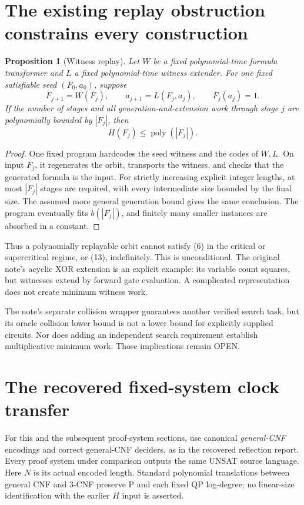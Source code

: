 \documentclass[11pt]{article}
\newtheorem{proposition}{Proposition}
\newcommand{\poly}{\operatorname{poly}}
\begin{document}
\section{The existing replay obstruction constrains every construction}

\begin{proposition}[Witness replay]
Let $W$ be a fixed polynomial-time formula transformer and $L$ a fixed
polynomial-time witness extender. For one fixed satisfiable seed
$(F_0,a_0)$, suppose
\[
 F_{j+1}=W(F_j),\qquad a_{j+1}=L(F_j,a_j),\qquad F_j(a_j)=1.
\]
If the number of stages and all generation-and-extension work through
stage $j$ are polynomially bounded by $|F_j|$, then
\[
 H(F_j)\le\poly(|F_j|).
 \tag{17}
\]
\end{proposition}

\begin{proof}
One fixed program hardcodes the seed witness and the codes of $W,L$.
On input $F_j$, it regenerates the orbit, transports the witness, and
checks that the generated formula is the input. For strictly increasing
explicit integer lengths, at most $|F_j|$ stages are required, with every
intermediate size bounded by the final size. The assumed more general
generation bound gives the same conclusion. The program eventually
fits $b(|F_j|)$, and finitely many smaller instances are absorbed in
a constant.
\end{proof}

Thus a polynomially replayable orbit cannot satisfy (6) in the critical
or supercritical regime, or (13), indefinitely. This is unconditional.
The original note's acyclic XOR extension is an explicit example:
its variable count squares, but witnesses extend by forward gate
evaluation. A complicated representation does not create minimum witness
work.

The note's separate collision wrapper guarantees another verified search
task, but its oracle collision lower bound is not a lower bound for
explicitly supplied circuits. Nor does adding an independent search
requirement establish multiplicative minimum work. Those implications
remain OPEN.

\section{The recovered fixed-system clock transfer}

For this and the subsequent proof-system sections, use canonical
\emph{general-CNF} encodings and correct general-CNF deciders, as in
the recovered reflection report. Every proof system under comparison
outputs the same UNSAT source language. Here $N$ is its actual encoded
length. Standard polynomial translations between general CNF and 3-CNF
preserve P and each fixed QP log-degree; no linear-size identification
with the earlier $H$ input is asserted.
\end{document}
